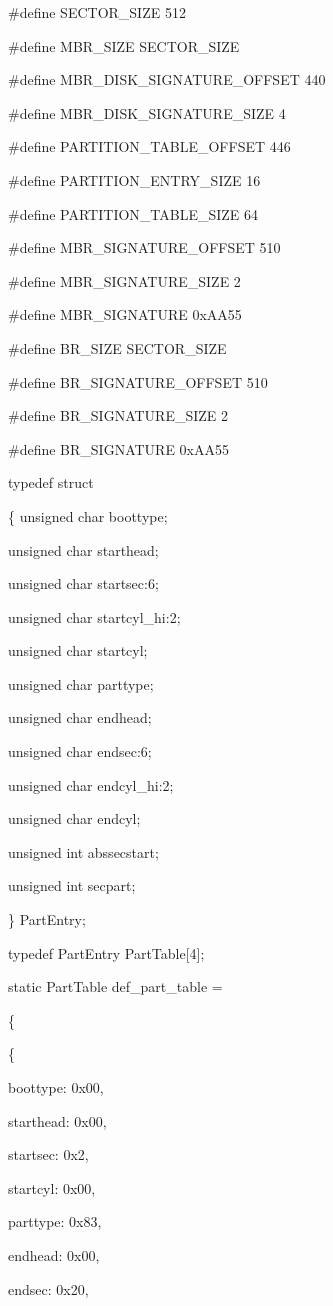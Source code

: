 \documentclass[11pt]{article}
\begin{document}
\#define SECTOR\_SIZE 512

\#define MBR\_SIZE SECTOR\_SIZE

\#define MBR\_DISK\_SIGNATURE\_OFFSET 440

\#define MBR\_DISK\_SIGNATURE\_SIZE 4

\#define PARTITION\_TABLE\_OFFSET 446

\#define PARTITION\_ENTRY\_SIZE 16 

\#define PARTITION\_TABLE\_SIZE 64 

\#define MBR\_SIGNATURE\_OFFSET 510

\#define MBR\_SIGNATURE\_SIZE 2

\#define MBR\_SIGNATURE 0xAA55

\#define BR\_SIZE SECTOR\_SIZE

\#define BR\_SIGNATURE\_OFFSET 510

\#define BR\_SIGNATURE\_SIZE 2

\#define BR\_SIGNATURE 0xAA55

typedef struct

\{
	unsigned char boottype;
	 
	unsigned char starthead;
	
	unsigned char startsec:6;
	
	unsigned char startcyl\_hi:2;
	
	unsigned char startcyl;
	
	unsigned char parttype;
	
	unsigned char endhead;
	
	unsigned char endsec:6;
	
	unsigned char endcyl\_hi:2;
	
	unsigned char endcyl;
	
	unsigned int abssecstart;
	
	unsigned int secpart;
	
\} PartEntry;

typedef PartEntry PartTable[4];

static PartTable def\_part\_table =

\{

	\{
	
		boottype: 0x00,
		
		starthead: 0x00,
		
		startsec: 0x2,
		
		startcyl: 0x00,
		
		parttype: 0x83,
		
		endhead: 0x00,
		
		endsec: 0x20,
		
\end{document}
